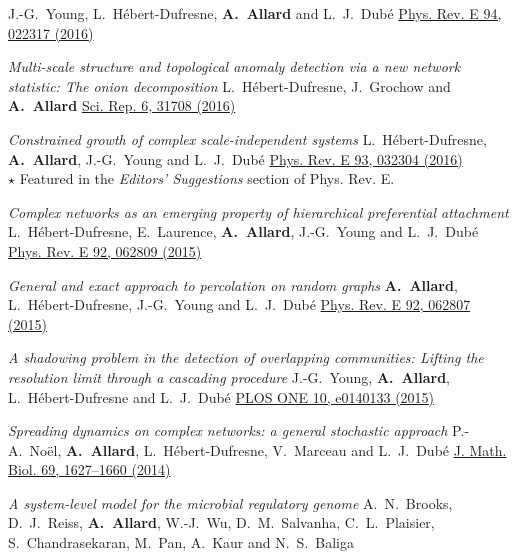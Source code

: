 \documentclass[11pt]{article}
\makeatletter
\newcommand{\reversearabic}[1]{\expandafter\@reversearabic\csname c@#1\endcsname}
\newcommand{\@reversearabic}[1]{%
  \number\numexpr\getrefnumber{this@etaremune@\romannumeral\c@etaremune}-#1+1\relax
}
\newcounter{etaremune}
\newenvironment{etaremune}[1][]{%
  \stepcounter{etaremune}%
  \begin{enumerate}[label=\reversearabic*.,#1]%
}{%
  \edef\@currentlabel{\the\csname c@\@enumctr\endcsname}%
  \label{this@etaremune@\romannumeral\c@etaremune}%
  \end{enumerate}%
}
\makeatother
\begin{document}
\begin{etaremune}[itemsep=0.5em, label={[A\reversearabic*]}]
{  J.-G.~Young, L.~H\'ebert-Dufresne, \textbf{A.~Allard} and L.~J.~Dub\'e\split
  \href{https://doi.org/10.1103/PhysRevE.94.022317}{Phys. Rev. E 94, 022317 (2016)}}
%
  \item \parbox[t]{\textwidth-30pt}{\textit{Multi-scale structure and topological anomaly detection via a new network statistic: The onion decomposition}\split
  L.~H\'ebert-Dufresne, J.~Grochow and \textbf{A.~Allard}\split
  \href{https://doi.org/10.1038/srep31708}{Sci. Rep. 6, 31708 (2016)}}
%
  \item \parbox[t]{\textwidth-30pt}{\textit{Constrained growth of complex scale-independent systems}\split
  L.~H\'ebert-Dufresne, \textbf{A.~Allard}, J.-G.~Young and L.~J.~Dub\'e\split
  \href{https://doi.org/10.1103/PhysRevE.93.032304}{Phys. Rev. E 93, 032304 (2016)}\\
  {\footnotesize $\star$ Featured in the \textit{Editors' Suggestions} section of Phys. Rev. E.}}
%
  \item \parbox[t]{\textwidth-30pt}{\textit{Complex networks as an emerging property of hierarchical preferential attachment}\split
  L.~H\'ebert-Dufresne, E.~Laurence, \textbf{A.~Allard}, J.-G.~Young and L.~J.~Dub\'e\split
  \href{https://doi.org/10.1103/PhysRevE.92.062809}{Phys. Rev. E 92, 062809 (2015)}}
%
  \item \parbox[t]{\textwidth-30pt}{\textit{General and exact approach to percolation on random graphs}\split
  \textbf{A.~Allard}, L.~H\'ebert-Dufresne, J.-G.~Young and L.~J.~Dub\'e\split
  \href{https://doi.org/10.1103/PhysRevE.92.062807}{Phys. Rev. E 92, 062807 (2015)}}
%
  \item \parbox[t]{\textwidth-30pt}{\textit{A shadowing problem in the detection of overlapping communities: Lifting the resolution limit through a cascading procedure}\split
  J.-G.~Young, \textbf{A.~Allard}, L.~H\'ebert-Dufresne and L.~J.~Dub\'e\split
  \href{https://doi.org/10.1371/journal.pone.0140133}{PLOS ONE 10, e0140133 (2015)}}
%
  \item \parbox[t]{\textwidth-30pt}{\textit{Spreading dynamics on complex networks: a general stochastic approach}\split
  P.-A.~No\"el, \textbf{A.~Allard}, L.~H\'ebert-Dufresne, V.~Marceau and L.~J.~Dub\'e\split
  \href{https://doi.org/10.1007/s00285-013-0744-9}{J. Math. Biol. 69, 1627--1660 (2014)}}
%
  \item \parbox[t]{\textwidth-30pt}{\textit{A system-level model for the microbial regulatory genome}\split
  A.~N.~Brooks, D.~J.~Reiss, \textbf{A.~Allard}, W.-J.~Wu, D.~M.~Salvanha, C.~L.~Plaisier, S.~Chandrasekaran, M.~Pan, A.~Kaur and N.~S.~Baliga\split
}
\end{etaremune}
\end{document}
